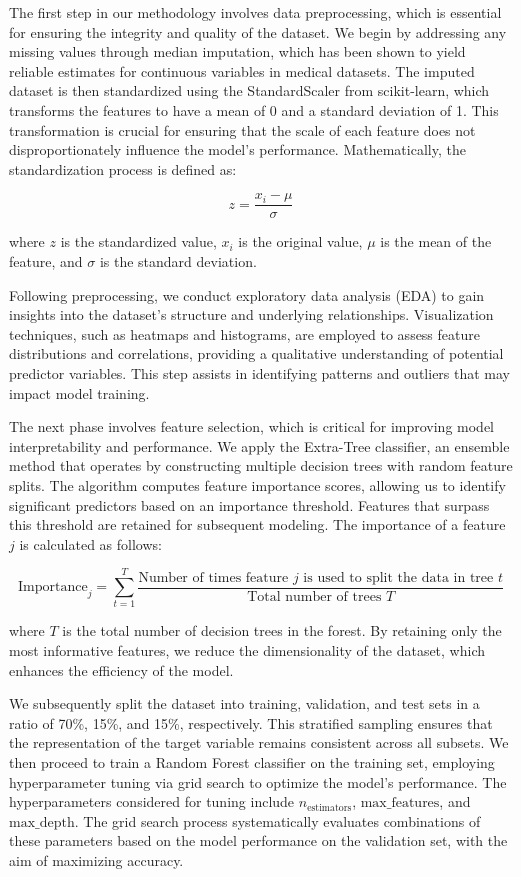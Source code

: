 \documentclass{article}
\begin{document}
The first step in our methodology involves data preprocessing, which is essential for ensuring the integrity and quality of the dataset. We begin by addressing any missing values through median imputation, which has been shown to yield reliable estimates for continuous variables in medical datasets. The imputed dataset is then standardized using the StandardScaler from scikit-learn, which transforms the features to have a mean of 0 and a standard deviation of 1. This transformation is crucial for ensuring that the scale of each feature does not disproportionately influence the model's performance. Mathematically, the standardization process is defined as:

\[
z = \frac{x_i - \mu}{\sigma}
\]

where \( z \) is the standardized value, \( x_i \) is the original value, \( \mu \) is the mean of the feature, and \( \sigma \) is the standard deviation.

Following preprocessing, we conduct exploratory data analysis (EDA) to gain insights into the dataset's structure and underlying relationships. Visualization techniques, such as heatmaps and histograms, are employed to assess feature distributions and correlations, providing a qualitative understanding of potential predictor variables. This step assists in identifying patterns and outliers that may impact model training.

The next phase involves feature selection, which is critical for improving model interpretability and performance. We apply the Extra-Tree classifier, an ensemble method that operates by constructing multiple decision trees with random feature splits. The algorithm computes feature importance scores, allowing us to identify significant predictors based on an importance threshold. Features that surpass this threshold are retained for subsequent modeling. The importance of a feature \( j \) is calculated as follows:

\[
\text{Importance}_j = \sum_{t=1}^{T} \frac{\text{Number of times feature } j \text{ is used to split the data in tree } t}{\text{Total number of trees } T}
\]

where \( T \) is the total number of decision trees in the forest. By retaining only the most informative features, we reduce the dimensionality of the dataset, which enhances the efficiency of the model.

We subsequently split the dataset into training, validation, and test sets in a ratio of 70\%, 15\%, and 15\%, respectively. This stratified sampling ensures that the representation of the target variable remains consistent across all subsets. We then proceed to train a Random Forest classifier on the training set, employing hyperparameter tuning via grid search to optimize the model's performance. The hyperparameters considered for tuning include \( n_{\text{estimators}} \), \( \text{max\_features} \), and \( \text{max\_depth} \). The grid search process systematically evaluates combinations of these parameters based on the model performance on the validation set, with the aim of maximizing accuracy.
\end{document}

